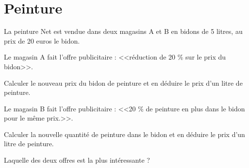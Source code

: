 \section{Peinture}

La peinture Net est vendue dans deux magasins A et B en bidons de 5 litres, au prix de 20 euros le bidon.

\begin{questions}
	\question Le magasin A fait l'offre publicitaire : <<réduction de 20 \% sur le prix du bidon>>.
	
	Calculer le nouveau prix du bidon de peinture et en déduire le prix d'un litre de peinture.
	
	\question Le magasin B fait l'offre publicitaire : <<20 \% de peinture en plus dans le bidon pour le même prix.>>.
	
	Calculer la nouvelle quantité de peinture dans le bidon et en déduire le prix d'un litre de peinture.
	
	\question Laquelle des deux offres est la plus intéressante ? 
\end{questions}